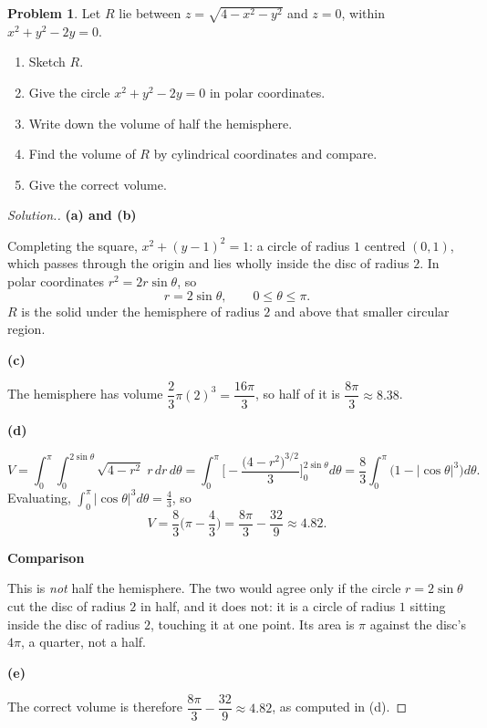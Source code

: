 \documentclass[11pt,a4paper]{article}
\theoremstyle{definition}
\newtheorem{problemx}{Problem}[subsection]
\newenvironment{problem}{\begin{problemx}}{\end{problemx}}
\newenvironment{solution}
  {\renewcommand{\qedsymbol}{}\begin{proof}[\textit{Solution}.]}
  {\end{proof}}
\newcommand{\subhead}[1]{%
  \par\medskip\noindent\textbf{#1}\par\nobreak\smallskip}
\begin{document}
\begin{problem}
Let $R$ lie between $z = \sqrt{4-x^2-y^2}$ and $z=0$, within
$x^2+y^2-2y = 0$.
\begin{enumerate}
\item[(a)] Sketch $R$.
\item[(b)] Give the circle $x^2+y^2-2y = 0$ in polar coordinates.
\item[(c)] Write down the volume of half the hemisphere.
\item[(d)] Find the volume of $R$ by cylindrical coordinates and compare.
\item[(e)] Give the correct volume.
\end{enumerate}
\end{problem}
\begin{solution}
\subhead{(a) and (b)}
Completing the square, $x^2+(y-1)^2 = 1$: a circle of radius $1$ centred
$(0,1)$, which passes through the origin and lies wholly inside the disc of
radius $2$. In polar coordinates $r^2 = 2r\sin\theta$, so
$$r = 2\sin\theta ,\qquad 0\leq\theta\leq\pi .$$
$R$ is the solid under the hemisphere of radius $2$ and above that smaller
circular region.

\subhead{(c)}
The hemisphere has volume $\dfrac23\pi(2)^3 = \dfrac{16\pi}{3}$, so half of it
is $\dfrac{8\pi}{3}\approx 8.38$.

\subhead{(d)}
$$V = \int_0^{\pi}\int_0^{2\sin\theta}\sqrt{4-r^2}\;r\,dr\,d\theta
= \int_0^{\pi}\Big[-\frac{\big(4-r^2\big)^{3/2}}{3}\Big]_0^{2\sin\theta}d\theta
= \frac{8}{3}\int_0^{\pi}\Big(1-\left|\cos\theta\right|^3\Big)d\theta .$$
Evaluating, $\displaystyle\int_0^{\pi}\left|\cos\theta\right|^3d\theta
= \frac43$, so
$$V = \frac83\Big(\pi - \frac43\Big) = \frac{8\pi}{3} - \frac{32}{9}
\approx 4.82 .$$

\subhead{Comparison}
This is \emph{not} half the hemisphere. The two would agree only if the circle
$r = 2\sin\theta$ cut the disc of radius $2$ in half, and it does not: it is a
circle of radius $1$ sitting inside the disc of radius $2$, touching it at one
point. Its area is $\pi$ against the disc's $4\pi$, a quarter, not a half.

\subhead{(e)}
The correct volume is therefore
$\dfrac{8\pi}{3}-\dfrac{32}{9}\approx 4.82$, as computed in (d).
\end{solution}
\end{document}
